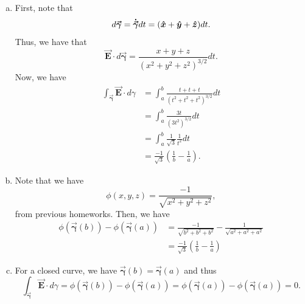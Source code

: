 \documentclass[12pt]{article} %
\newcommand{\curvegamma}{\boldsymbol{\vec{\gamma}}}
\newcommand{\tangentgamma}{\boldsymbol{\dot{\vec{\gamma}}}}
\newcommand{\vecfieldE}{\boldsymbol{\vec{E}}}
\begin{document}
\begin{solution}
\begin{enumerate}[(a)]
    \item First, note that
    \[
    d\curvegamma = \tangentgamma dt = (\xhat + \yhat + \zhat)dt.
    \]
    Thus, we have that
    \[
    \vecfieldE \cdot d\curvegamma = \frac{x+y+z}{\left(x^2+y^2+z^2\right)^{3/2}}dt.
    \]
    Now, we have
    \begin{align*}
        \int_{\curvegamma} \vecfieldE \cdot d\gamma &= \int_a^b \frac{t+t+t}{\left(t^2+t^2+t^2\right)^{3/2}} dt\\
        &= \int_a^b \frac{3t}{(3t^2)^{3/2}}dt\\
        &= \int_a^b \frac{1}{\sqrt{3}} \frac{1}{t^2} dt\\
        &= \frac{-1}{\sqrt{3}}\left(\frac{1}{b} - \frac{1}{a}\right).
    \end{align*}
    \item Note that we have
    \[
    \phi(x,y,z) = \frac{-1}{\sqrt{x^2+y^2+z^2}},
    \]
    from previous homeworks.  Then, we have
    \begin{align*}
        \phi(\curvegamma(b))-\phi(\curvegamma(a)) &= \frac{-1}{\sqrt{b^2+b^2+b^2}}-\frac{1}{\sqrt{a^2+a^2+a^2}}\\
        &= \frac{-1}{\sqrt{3}} \left(\frac{1}{b}-\frac{1}{a}\right)
    \end{align*}
    \item For a closed curve, we have $\curvegamma(b)=\curvegamma(a)$ and thus
    \[
    \int_{\curvegamma} \vecfieldE \cdot d\gamma = \phi(\curvegamma(b))-\phi(\curvegamma(a)) = \phi(\curvegamma(a))-\phi(\curvegamma(a))=0.
    \]
\end{enumerate}
\end{solution}
\end{document}

